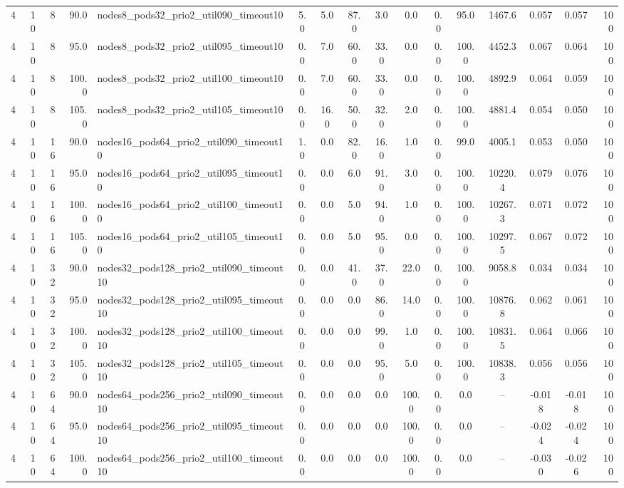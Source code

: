 \begin{tabular}{r r r r l c c c c c c c c c c r}
4 & 10 & 8 & 90.0 & nodes8\_pods32\_prio2\_util090\_timeout10 & 5.0 & 5.0 & 87.0 & 3.0 & 0.0 & 0.0 & 95.0 & 1467.6 & 0.057 & 0.057 & 100 \\
4 & 10 & 8 & 95.0 & nodes8\_pods32\_prio2\_util095\_timeout10 & 0.0 & 7.0 & 60.0 & 33.0 & 0.0 & 0.0 & 100.0 & 4452.3 & 0.067 & 0.064 & 100 \\
4 & 10 & 8 & 100.0 & nodes8\_pods32\_prio2\_util100\_timeout10 & 0.0 & 7.0 & 60.0 & 33.0 & 0.0 & 0.0 & 100.0 & 4892.9 & 0.064 & 0.059 & 100 \\
4 & 10 & 8 & 105.0 & nodes8\_pods32\_prio2\_util105\_timeout10 & 0.0 & 16.0 & 50.0 & 32.0 & 2.0 & 0.0 & 100.0 & 4881.4 & 0.054 & 0.050 & 100 \\
4 & 10 & 16 & 90.0 & nodes16\_pods64\_prio2\_util090\_timeout10 & 1.0 & 0.0 & 82.0 & 16.0 & 1.0 & 0.0 & 99.0 & 4005.1 & 0.053 & 0.050 & 100 \\
4 & 10 & 16 & 95.0 & nodes16\_pods64\_prio2\_util095\_timeout10 & 0.0 & 0.0 & 6.0 & 91.0 & 3.0 & 0.0 & 100.0 & 10220.4 & 0.079 & 0.076 & 100 \\
4 & 10 & 16 & 100.0 & nodes16\_pods64\_prio2\_util100\_timeout10 & 0.0 & 0.0 & 5.0 & 94.0 & 1.0 & 0.0 & 100.0 & 10267.3 & 0.071 & 0.072 & 100 \\
4 & 10 & 16 & 105.0 & nodes16\_pods64\_prio2\_util105\_timeout10 & 0.0 & 0.0 & 5.0 & 95.0 & 0.0 & 0.0 & 100.0 & 10297.5 & 0.067 & 0.072 & 100 \\
4 & 10 & 32 & 90.0 & nodes32\_pods128\_prio2\_util090\_timeout10 & 0.0 & 0.0 & 41.0 & 37.0 & 22.0 & 0.0 & 100.0 & 9058.8 & 0.034 & 0.034 & 100 \\
4 & 10 & 32 & 95.0 & nodes32\_pods128\_prio2\_util095\_timeout10 & 0.0 & 0.0 & 0.0 & 86.0 & 14.0 & 0.0 & 100.0 & 10876.8 & 0.062 & 0.061 & 100 \\
4 & 10 & 32 & 100.0 & nodes32\_pods128\_prio2\_util100\_timeout10 & 0.0 & 0.0 & 0.0 & 99.0 & 1.0 & 0.0 & 100.0 & 10831.5 & 0.064 & 0.066 & 100 \\
4 & 10 & 32 & 105.0 & nodes32\_pods128\_prio2\_util105\_timeout10 & 0.0 & 0.0 & 0.0 & 95.0 & 5.0 & 0.0 & 100.0 & 10838.3 & 0.056 & 0.056 & 100 \\
4 & 10 & 64 & 90.0 & nodes64\_pods256\_prio2\_util090\_timeout10 & 0.0 & 0.0 & 0.0 & 0.0 & 100.0 & 0.0 & 0.0 & -- & -0.018 & -0.018 & 100 \\
4 & 10 & 64 & 95.0 & nodes64\_pods256\_prio2\_util095\_timeout10 & 0.0 & 0.0 & 0.0 & 0.0 & 100.0 & 0.0 & 0.0 & -- & -0.024 & -0.024 & 100 \\
4 & 10 & 64 & 100.0 & nodes64\_pods256\_prio2\_util100\_timeout10 & 0.0 & 0.0 & 0.0 & 0.0 & 100.0 & 0.0 & 0.0 & -- & -0.030 & -0.026 & 100 \\

\end{tabular}
